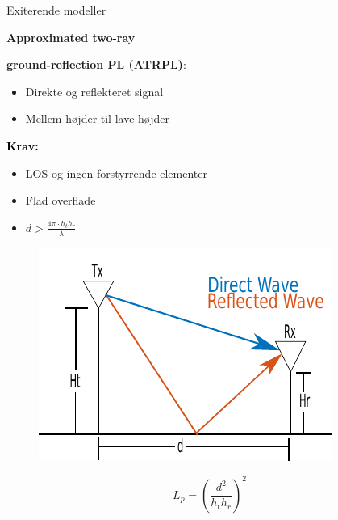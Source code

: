\begin{frame}{Exiterende modeller}
\begin{minipage}{.45\textwidth}
\raggedright\textcolor{thomasred}{\textbf{Approximated two-ray}}\\
\raggedright\textcolor{thomasred}{\textbf{ground-reflection PL (ATRPL)}:}
\begin{itemize}
\item Direkte og reflekteret signal
\item Mellem højder til lave højder
\end{itemize} 

\vspace{1em}
\textcolor{black}{\textbf{Krav:}}
\begin{itemize}
\item LOS og ingen forstyrrende elementer
\item Flad overflade
\item $d > \frac{4\pi \cdot h_t h_r }{\lambda}$
\end{itemize}

\end{minipage}
\begin{minipage}{0.5\textwidth}
\begin{figure}[!htbp]
 \centering
  \includegraphics[width = \columnwidth]{figures/two_ray_illu.pdf}
  \end{figure}
\end{minipage}

\vspace{1em}
\begin{equation*}
L_{p} = \left(\frac{d^2}{h_t h_r}\right)^2
\label{two_ray_model}
\end{equation*}
\end{frame}


